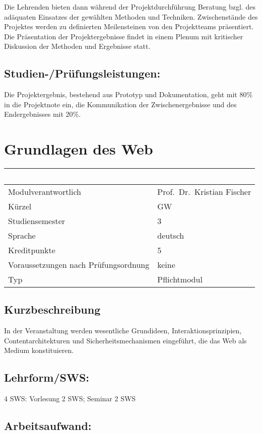 Die Lehrenden bieten dann während der Projektdurchführung Beratung bzgl.
des adäquaten Einsatzes der gewählten Methoden und Techniken.
Zwischenstände des Projektes werden zu definierten Meilensteinen von den
Projektteams präsentiert. Die Präsentation der Projektergebnisse findet
in einem Plenum mit kritischer Diskussion der Methoden und Ergebnisse
statt.

\section*{Studien-/Prüfungsleistungen:}\label{studien-pruxfcfungsleistungen-9}

Die Projektergebnis, bestehend aus Prototyp und Dokumentation, geht mit
80\% in die Projektnote ein, die Kommunikation der Zwischenergebnisse
und des Endergebnisses mit 20\%.

\chapter{Grundlagen des Web}\label{grundlagen-des-web}

\begin{longtable}[]{@{}ll@{}}
\toprule
~ & ~\tabularnewline
\midrule
\endhead
Modulverantwortlich & Prof.~Dr.~Kristian Fischer\tabularnewline
Kürzel & GW\tabularnewline
Studiensemester & 3\tabularnewline
Sprache & deutsch\tabularnewline
Kreditpunkte & 5\tabularnewline
Voraussetzungen nach Prüfungsordnung & keine\tabularnewline
Typ & Pflichtmodul\tabularnewline
\bottomrule
\end{longtable}

\section*{Kurzbeschreibung}\label{kurzbeschreibung-1}

In der Veranstaltung werden wesentliche Grundideen,
Interaktionsprinzipien, Contentarchitekturen und Sicherheitsmechanismen
eingeführt, die das Web als Medium konstituieren.

\section*{Lehrform/SWS:}\label{lehrformsws-11}

4 SWS: Vorlesung 2 SWS; Seminar 2 SWS

\section*{Arbeitsaufwand:}\label{arbeitsaufwand-11}

